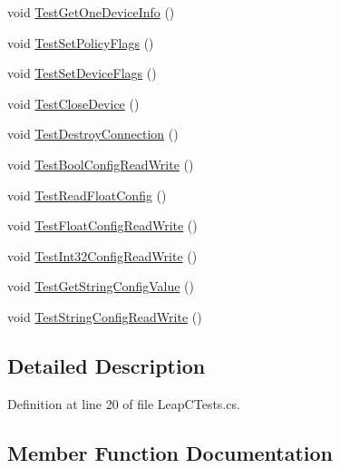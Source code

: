 \begin{DoxyCompactItemize}
void \mbox{\hyperlink{class_leap_1_1_leap_c_sharp_1_1_tests_1_1_leap_c_tests_af42fcf33b5e08ca63cf812c8ecd6107e}{Test\+Get\+One\+Device\+Info}} ()
\item 
void \mbox{\hyperlink{class_leap_1_1_leap_c_sharp_1_1_tests_1_1_leap_c_tests_a12b95b37a88a37e7b5c12df660ec8fcd}{Test\+Set\+Policy\+Flags}} ()
\item 
void \mbox{\hyperlink{class_leap_1_1_leap_c_sharp_1_1_tests_1_1_leap_c_tests_a8811c998921b7ed219bf18267e614482}{Test\+Set\+Device\+Flags}} ()
\item 
void \mbox{\hyperlink{class_leap_1_1_leap_c_sharp_1_1_tests_1_1_leap_c_tests_abd6e8c308243d73ea8a0155ff7a149c8}{Test\+Close\+Device}} ()
\item 
void \mbox{\hyperlink{class_leap_1_1_leap_c_sharp_1_1_tests_1_1_leap_c_tests_a34eb0854ca584dca96bc4e06c3eb7b36}{Test\+Destroy\+Connection}} ()
\item 
void \mbox{\hyperlink{class_leap_1_1_leap_c_sharp_1_1_tests_1_1_leap_c_tests_aa01479ceba9659a80f925a8fe6b8353a}{Test\+Bool\+Config\+Read\+Write}} ()
\item 
void \mbox{\hyperlink{class_leap_1_1_leap_c_sharp_1_1_tests_1_1_leap_c_tests_accf1499cc14bcc1ced1847bc9117efb8}{Test\+Read\+Float\+Config}} ()
\item 
void \mbox{\hyperlink{class_leap_1_1_leap_c_sharp_1_1_tests_1_1_leap_c_tests_a2fa791a01bb6eab31427eed6d885e5d7}{Test\+Float\+Config\+Read\+Write}} ()
\item 
void \mbox{\hyperlink{class_leap_1_1_leap_c_sharp_1_1_tests_1_1_leap_c_tests_abf861db3c801ee6093aeadd83fcaf034}{Test\+Int32\+Config\+Read\+Write}} ()
\item 
void \mbox{\hyperlink{class_leap_1_1_leap_c_sharp_1_1_tests_1_1_leap_c_tests_a71310966231add3d3e472008c4ec263e}{Test\+Get\+String\+Config\+Value}} ()
\item 
void \mbox{\hyperlink{class_leap_1_1_leap_c_sharp_1_1_tests_1_1_leap_c_tests_aec37424aa98f2862249fa54797b69b70}{Test\+String\+Config\+Read\+Write}} ()
\end{DoxyCompactItemize}


\subsection{Detailed Description}


Definition at line 20 of file Leap\+C\+Tests.\+cs.



\subsection{Member Function Documentation}
\mbox{\label{class_leap_1_1_leap_c_sharp_1_1_tests_1_1_leap_c_tests_aa01479ceba9659a80f925a8fe6b8353a}} 
